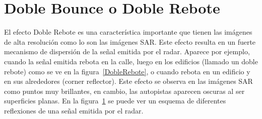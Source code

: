 \section{Doble Bounce o Doble Rebote}
\label{DobleBounce}
El efecto Doble Rebote es una característica importante que tienen las  imágenes de alta resolución como lo son las imágenes SAR. Este efecto resulta en un fuerte mecanismo de dispersión de la señal emitida por el radar. Aparece por ejemplo, cuando la señal emitida rebota en la calle, luego en los edificios (llamado un doble rebote) como se ve en la figura~\ref{DobleRebote}, o cuando rebota en un edificio y en sus alrededores (corner reflector).  Este efecto se observa en las imágenes SAR como puntos muy brillantes, en cambio, las autopistas aparecen oscuras al ser superficies planas. En la figura~\ref{DobleBounce} se puede ver un esquema de diferentes reflexiones de una señal emitida por el radar.
